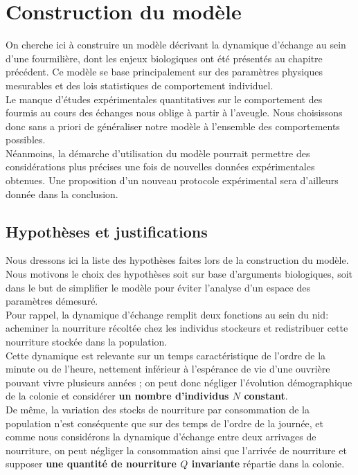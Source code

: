 \chapter{Construction du modèle}

On cherche ici à construire un modèle décrivant la dynamique d'échange au sein d'une fourmilière, dont les enjeux biologiques ont été présentés au chapitre précédent. Ce modèle se base principalement sur des paramètres physiques mesurables et des lois statistiques de comportement individuel. \\

Le manque d'études expérimentales quantitatives sur le comportement des fourmis au cours des échanges nous oblige à partir à l'aveugle. Nous choisissons donc sans a priori de généraliser notre modèle à l'ensemble des comportements possibles.\\

Néanmoins, la démarche d'utilisation du modèle pourrait permettre des considérations plus précises une fois de nouvelles données expérimentales obtenues. Une proposition d'un nouveau protocole expérimental sera d'ailleurs donnée dans la conclusion.


\section{Hypothèses et justifications}
Nous dressons ici la liste des hypothèses faites lors de la construction du modèle. Nous motivons le choix des hypothèses soit sur base d'arguments biologiques, soit dans le but de simplifier le modèle pour éviter l'analyse d'un espace des paramètres démesuré.\\

Pour rappel, la dynamique d'échange remplit deux fonctions au sein du nid: acheminer la nourriture récoltée chez les individus stockeurs et redistribuer cette nourriture stockée dans la population. \\

Cette dynamique est relevante sur un temps caractéristique de l'ordre de la minute ou de l'heure, nettement inférieur à l'espérance de vie d'une ouvrière pouvant vivre plusieurs années \citep{holldobler_ants_1990}; on peut donc négliger l'évolution démographique de la colonie et considérer \textbf{un nombre d'individus $N$ constant}.\\

De même, la variation des stocks de nourriture par consommation de la population n'est conséquente que sur des temps de l'ordre de la journée, et comme nous considérons la dynamique d'échange entre deux arrivages de nourriture, on peut négliger la consommation ainsi que l'arrivée de nourriture et supposer \textbf{une quantité de nourriture $Q$ invariante} répartie dans la colonie.\\



